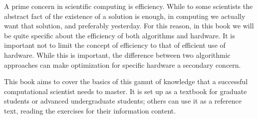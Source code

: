 A prime concern in scientific computing is efficiency. While to some
scientists the abstract fact of the existence of a solution is enough,
in computing we actually want that solution, and preferably
yesterday. For this reason, in this book we will be quite specific about the
efficiency of both algorithms and hardware. It is important not to
limit the concept of efficiency to that of efficient use of
hardware. While this is important, the difference between two
algorithmic approaches can make optimization for specific hardware a
secondary concern.

This book aims to cover the basics of this gamut of knowledge that a
successful computational scientist needs to master. It is set up as a
textbook for graduate students or advanced undergraduate students;
others can use it as a reference text, reading the exercises for their
information content.

